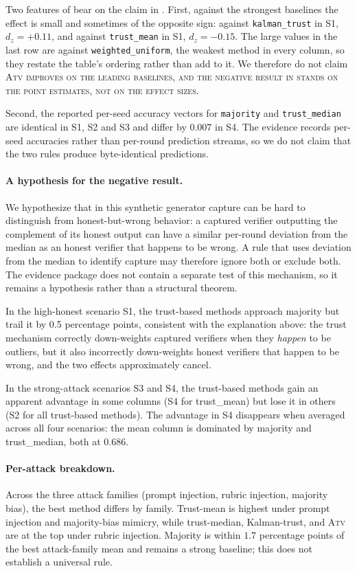 \documentclass[11pt]{article}
\begin{document}
Two features of  bear on the claim in . First,
against the strongest baselines the effect is small and sometimes of the
opposite sign: against \texttt{kalman\_trust} in S1, $d_z = +0.11$, and against
\texttt{trust\_mean} in S1, $d_z = -0.15$. The large values in the last row are
against \texttt{weighted\_uniform}, the weakest method in every column, so they
restate the table's ordering rather than add to it. We therefore do not claim
\scshape{Atv} improves on the leading baselines, and the negative result in
 stands on the point estimates, not on the effect sizes.

Second, the reported per-seed accuracy vectors for \texttt{majority} and
\texttt{trust\_median} are identical in S1, S2 and S3 and differ by $0.007$ in
S4. The evidence records per-seed accuracies rather than per-round prediction
streams, so we do not claim that the two rules produce byte-identical
predictions.

\paragraph{A hypothesis for the negative result.}
We hypothesize that in this synthetic generator capture can be hard to
distinguish from honest-but-wrong behavior: a captured verifier outputting
the complement of its honest output can have a similar per-round deviation
from the median as an honest verifier that happens to be wrong. A rule that
uses deviation from the median to identify capture may therefore ignore both
or exclude both. The evidence package does not contain a separate test of
this mechanism, so it remains a hypothesis rather than a structural theorem.

In the high-honest scenario S1, the trust-based methods approach
majority but trail it by 0.5 percentage points, consistent with the
explanation above: the trust mechanism correctly down-weights
captured verifiers when they \emph{happen} to be outliers, but it
also incorrectly down-weights honest verifiers that happen to be
wrong, and the two effects approximately cancel.

In the strong-attack scenarios S3 and S4, the trust-based methods
gain an apparent advantage in some columns (S4 for trust\_mean) but
lose it in others (S2 for all trust-based methods). The advantage in
S4 disappears when averaged across all four scenarios: the mean
column is dominated by majority and trust\_median, both at $0.686$.

\paragraph{Per-attack breakdown.}
Across the three attack families (prompt injection, rubric injection,
majority bias), the best method differs by family. Trust-mean is highest
under prompt injection and majority-bias mimicry, while trust-median,
Kalman-trust, and \textsc{Atv} are at the top under rubric injection.
Majority is within $1.7$ percentage points of the best attack-family mean
and remains a strong baseline; this does not establish a universal rule.
\end{document}
